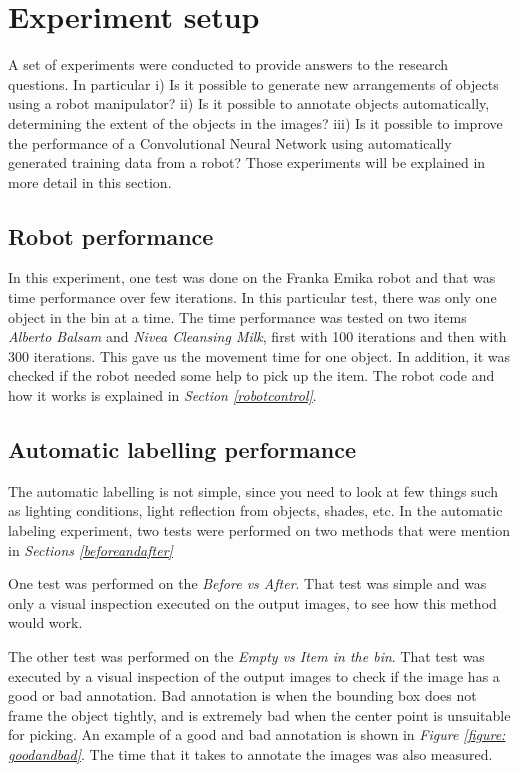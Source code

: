 \clearpage
\section{Experiment setup}
A set of experiments were conducted to provide answers to the research questions. In particular i) Is it possible to generate new arrangements of objects using a robot manipulator? ii) Is it possible to annotate objects automatically, determining the extent of the objects in the images? iii) Is it possible to improve the performance of a Convolutional Neural Network using automatically generated training data from a robot? Those experiments will be explained in more detail in this section. 
\subsection{Robot performance}
In this experiment, one test was done on the Franka Emika robot and that was time performance over few iterations. In this particular test, there was only one object in the bin at a time. The time performance was tested on two items \textit{Alberto Balsam} and \textit{Nivea Cleansing Milk}, first with 100 iterations and then with 300 iterations. This gave us the movement time for one object. In addition, it was checked if the robot needed some help to pick up the item. The robot code and how it works is explained in \textit{Section \ref{robotcontrol}}. 

\subsection{Automatic labelling performance}
The automatic labelling is not simple, since you need to look at few things such as lighting conditions, light reflection from objects, shades, etc. 
In the automatic labeling experiment, two tests were performed on two methods that were mention in \textit{Sections \ref{beforeandafter}}

One test was performed on the \textit{Before vs After}. That test was simple and was only a visual inspection executed on the output images, to see how this method would work. %

The other test was performed on the \textit{Empty vs Item in the bin}. That test was executed by a visual inspection of the output images to check if the image has a good or bad annotation. Bad annotation is when the bounding box does not frame the object tightly, and is extremely bad when the center point is unsuitable for picking. An example of a good and bad annotation is shown in \textit{Figure \ref{figure: goodandbad}}. The time that it takes to annotate the images was also measured.

